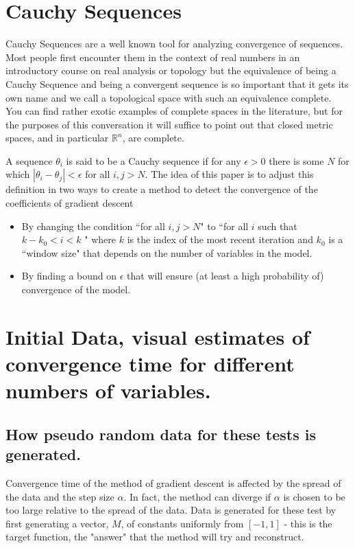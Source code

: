 \documentclass[11pt]{article} %
\begin{document}
\section{Cauchy Sequences}
Cauchy Sequences are a well known tool for analyzing convergence of sequences.  Most people first encounter them in the context of real numbers
in an introductory course on real analysis or topology but the equivalence of being a Cauchy Sequence and being a convergent sequence is so important 
that it gets its own name and we call a topological space with such an equivalence complete.  You can find rather exotic examples of complete spaces in
the literature, but for the purposes of this conversation it will suffice to point out that closed metric spaces, and in particular $\mathbb{R}^{n}$, are complete. 

A sequence $\theta_{i}$ is said to be a Cauchy sequence if for any $\epsilon > 0$ there is some $N$ for which $|\theta_{i} - \theta_{j}| < \epsilon$ for all $i, j > N$. 
The idea of this paper is to adjust this definition in two ways to create a method to detect the convergence of the coefficients of gradient descent 

\begin{itemize} 
\item By changing the condition ``for all $i,j > N$"  to
``for all $i$ such that $k - k_{0} < i < k$ " where $k$ is the index of the most recent iteration and $k_{0}$ is a ``window size" that depends on the number of variables in the model.  
\item By finding a bound on $\epsilon$ that will ensure (at least a high probability of) convergence of the model.  

\end{itemize}

\section{Initial Data, visual estimates of convergence time for different numbers of variables.}
\subsection{How pseudo random data for these tests is generated.}
Convergence time of the method of gradient descent is affected by the spread of the data and the step size $\alpha$.  In fact, the method can diverge if 
$\alpha$ is chosen to be too large relative to the spread of the data. 
Data is generated for these test by first generating a vector, $M$, of constants uniformly from  $[-1,1]$ - this is the 
target function, the "answer" that the method will try and reconstruct.  
\end{document}
